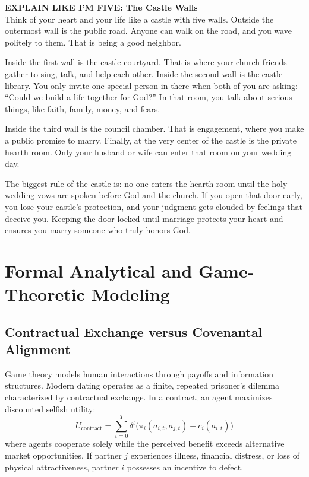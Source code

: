 \documentclass[11pt,twocolumn]{article}
\begin{document}
\begin{eli5box}
\textbf{EXPLAIN LIKE I'M FIVE: The Castle Walls}\\
Think of your heart and your life like a castle with five walls. Outside the outermost wall is the public road. Anyone can walk on the road, and you wave politely to them. That is being a good neighbor. 

Inside the first wall is the castle courtyard. That is where your church friends gather to sing, talk, and help each other. Inside the second wall is the castle library. You only invite one special person in there when both of you are asking: ``Could we build a life together for God?'' In that room, you talk about serious things, like faith, family, money, and fears. 

Inside the third wall is the council chamber. That is engagement, where you make a public promise to marry. Finally, at the very center of the castle is the private hearth room. Only your husband or wife can enter that room on your wedding day. 

The biggest rule of the castle is: no one enters the hearth room until the holy wedding vows are spoken before God and the church. If you open that door early, you lose your castle's protection, and your judgment gets clouded by feelings that deceive you. Keeping the door locked until marriage protects your heart and ensures you marry someone who truly honors God.
\end{eli5box}

\section{Formal Analytical and Game-Theoretic Modeling}

\subsection{Contractual Exchange versus Covenantal Alignment}
Game theory models human interactions through payoffs and information structures. Modern dating operates as a finite, repeated prisoner's dilemma characterized by contractual exchange. In a contract, an agent maximizes discounted selfish utility:
\begin{equation}
U_{\text{contract}} = \sum_{t=0}^{T} \delta^t \Big( \pi_i(a_{i,t}, a_{j,t}) - c_i(a_{i,t}) \Big)
\end{equation}
where agents cooperate solely while the perceived benefit exceeds alternative market opportunities. If partner $j$ experiences illness, financial distress, or loss of physical attractiveness, partner $i$ possesses an incentive to defect.
\end{document}
